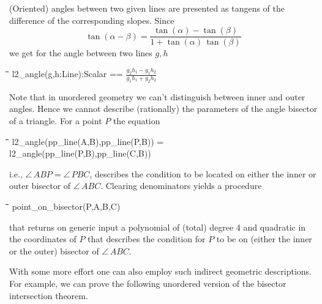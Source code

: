 \documentclass{article}
\newenvironment{code}{\tt \begin{tabbing}
\hspace*{1cm}\=\hspace*{1cm}\=\hspace*{1cm}\=
\hspace*{1cm}\=\hspace*{1cm}\=\kill
}{\end{tabbing}}
\begin{document}
(Oriented) angles between two given lines are presented as tangens of
the difference of the corresponding slopes. Since
\[\tan(\alpha-\beta) = \frac{\tan(\alpha)-\tan(\beta)}{1+
\tan(\alpha)\, \tan(\beta)}\] 
we get for the angle between two lines $g,h$
\begin{code}\>
l2\_angle(g,h:Line):Scalar == $\frac{g_2h_1-g_1h_2}{g_1h_1+g_2h_2}$
\end{code}

Note that in unordered geometry we can't distinguish between inner and
outer angles. Hence we cannot describe (rationally) the parameters of
the angle bisector of a triangle. For a point $P$ the equation 
\begin{code}\>
l2\_angle(pp\_line(A,B),pp\_line(P,B)) =\\\>\>\>
	l2\_angle(pp\_line(P,B),pp\_line(C,B))
\end{code}
i.e., $\angle\,ABP=\angle\,PBC$, describes the condition to be located
on either the inner or outer bisector of $\angle\,ABC$. Clearing
denominators yields a procedure
\begin{code}\>
point\_on\_bisector(P,A,B,C)
\end{code}
that returns on generic input a polynomial of (total) degree 4 and
quadratic in the coordinates of $P$ that describes the condition for
$P$ to be on (either the inner or the outer) bisector of
$\angle\,ABC$.
\medskip

With some more effort one can also employ such indirect geometric
descriptions. For example, we can prove the following unordered
version of the bisector intersection theorem.
\medskip
\end{document}
